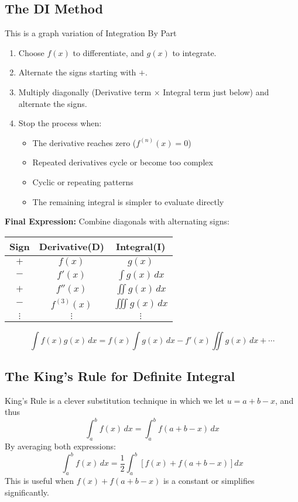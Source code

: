 \documentclass[11pt]{article}
\begin{document}
\subsection{The DI Method}
This is a graph variation of Integration By Part
\begin{enumerate}
    \item Choose $f(x)$ to differentiate, and $g(x)$ to integrate.
    \item Alternate the signs starting with $+$.
    \item Multiply diagonally (Derivative term $\times$ Integral term just below) and alternate the signs.
    \item Stop the process when:
        \begin{itemize}
            \item The derivative reaches zero ($f^{(n)}(x) = 0$)
            \item Repeated derivatives cycle or become too complex
            \item Cyclic or repeating patterns
            \item The remaining integral is simpler to evaluate directly
        \end{itemize}
\end{enumerate}
\textbf{Final Expression:} Combine diagonals with alternating signs:
\begin{center}
        \renewcommand{\arraystretch}{2}
        \begin{tabular}{c|c|c}
            \textbf{Sign} & \textbf{Derivative(D)} & \textbf{Integral(I)} \\
            \hline
            $+$ \qquad& $f(x)$         \qquad& $ g(x) $ \\
            $-$ \qquad& $f'(x)$        \qquad& $\int g(x) \, dx$ \\
            $+$ \qquad& $f''(x)$       \qquad& $\iint g(x) \, dx$ \\
            $-$ \qquad& $f^{(3)}(x)$   \qquad& $\iiint g(x) \, dx$ \\
            $\vdots$ & $\vdots$ & $\vdots$ \\
        \end{tabular}
\end{center}
\[
    \int f(x) g(x) \, dx = f(x) \int g(x)\,dx - f'(x) \iint g(x)\,dx + \cdots
\]
\subsection{The King's Rule for Definite Integral}
King's Rule is a clever substitution technique in which we let $u=a+b-x$, and thus
\[
    \boxed{
        \int_a^b f(x)\,dx = \int_a^b f(a + b - x)\,dx
    }
\]By averaging both expressions:
\[
    \int_a^b f(x)\,dx = \frac{1}{2} \int_a^b \left[ f(x) + f(a + b - x) \right] dx
\]This is useful when $f(x) + f(a + b - x)$ is a constant or simplifies significantly.
\end{document}
